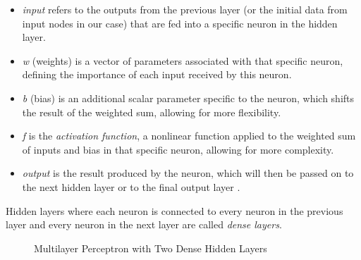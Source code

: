\begin{itemize}
  \item \textit{input} refers to the outputs from the previous layer (or the initial data from input nodes in our case) that are fed into a specific neuron in the hidden layer.
  \item \textit{w} (weights) is a vector of parameters associated with that specific neuron, defining the importance of each input received by this neuron. 
  \item \textit{b} (bias) is an additional scalar parameter specific to the neuron, which shifts the result of the weighted sum, allowing for more flexibility.
  \item \textit{f} is the \textit{activation function}, a nonlinear function applied to the weighted sum of inputs and bias in that specific neuron, allowing for more complexity.
  \item \textit{output} is the result produced by the neuron, which will then be passed on to the next hidden layer or to the final output layer \cite{han2016deepcompression}.
\end{itemize}

\noindent Hidden layers where each neuron is connected to every neuron in the previous layer 
and every neuron in the next layer are called \textit{dense layers}.


\begin{figure}[h!]
  \centering
  \caption{Multilayer Perceptron with Two Dense Hidden Layers}
  \label{fig:mlp_diagram}
\end{figure}


